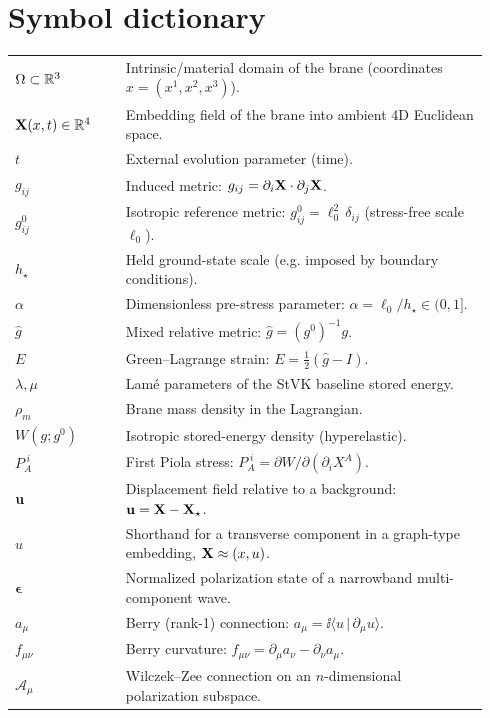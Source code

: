 \section{Symbol dictionary}
\label{sec:symbols}

\begin{center}
\begin{tabular}{p{0.22\linewidth} p{0.72\linewidth}}
$\Omega\subset\mathbb{R}^3$ & Intrinsic/material domain of the brane (coordinates $x=(x^1,x^2,x^3)$).\\
$\mathbf{X}(x,t)\in\mathbb{R}^4$ & Embedding field of the brane into ambient 4D Euclidean space.\\
$t$ & External evolution parameter (time).\\
$g_{ij}$ & Induced metric: $g_{ij}=\partial_i\mathbf{X}\cdot\partial_j\mathbf{X}$.\\
$g^0_{ij}$ & Isotropic reference metric: $g^0_{ij}=\ell_0^2\,\delta_{ij}$ (stress-free scale $\ell_0$).\\
$h_\star$ & Held ground-state scale (e.g. imposed by boundary conditions).\\
$\alpha$ & Dimensionless pre-stress parameter: $\alpha=\ell_0/h_\star\in(0,1]$.\\
$\widehat g$ & Mixed relative metric: $\widehat g=(g^0)^{-1}g$.\\
$E$ & Green--Lagrange strain: $E=\tfrac12(\widehat g-I)$.\\
$\lambda,\mu$ & Lam\'e parameters of the StVK baseline stored energy.\\
$\rho_m$ & Brane mass density in the Lagrangian.\\
$W(g;g^0)$ & Isotropic stored-energy density (hyperelastic).\\
$P_A^{\;i}$ & First Piola stress: $P_A^{\;i}=\partial W/\partial(\partial_i X^A)$.\\
$\mathbf{u}$ & Displacement field relative to a background: $\mathbf{u}=\mathbf{X}-\mathbf{X}_\star$.\\
$u$ & Shorthand for a transverse component in a graph-type embedding, $\mathbf{X}\approx(x,u)$.\\
$\bm{\epsilon}$ & Normalized polarization state of a narrowband multi-component wave.\\
$a_\mu$ & Berry (rank-1) connection: $a_\mu=\ii\langle u\,|\,\partial_\mu u\rangle$.\\
$f_{\mu\nu}$ & Berry curvature: $f_{\mu\nu}=\partial_\mu a_\nu-\partial_\nu a_\mu$.\\
$\mathcal{A}_\mu$ & Wilczek--Zee connection on an $n$-dimensional polarization subspace.\\

\end{tabular}
\end{center}
